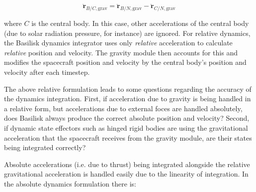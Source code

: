 \begin{equation}
	\ddot{\bm{r}}_{B/C, \mathrm{grav}} =\ddot{\bm{r}}_{B/N, \mathrm{grav}} - \ddot{\bm{r}}_{C/N, \mathrm{grav}}
\end{equation}

where $C$ is the central body. In this case, other accelerations of the central body (due to solar radiation pressure, for instance) are ignored.  For relative dynamics, the Basilisk dynamics integrator uses only \textit{relative} acceleration to calculate \textit{relative} position and velocity. The gravity module then accounts for this and modifies the spacecraft position and velocity by the central body's position and velocity after each timestep.

The above relative formulation leads to some questions regarding the accuracy of the dynamics integration. First, if acceleration due to gravity is being handled in a relative form, but accelerations due to external foces are handled absolutely, does Basilisk always produce the correct absolute position and velocity? Second, if dynamic state effectors such as hinged rigid bodies are using the gravitational acceleration that the spacecraft receives from the gravity module, are their states being integrated correctly?

Absolute accelerations (i.e. due to thrust) being integrated alongside the relative gravitational acceleration is handled easily due to the linearity of integration. In the absolute dynamics formulation there is:

